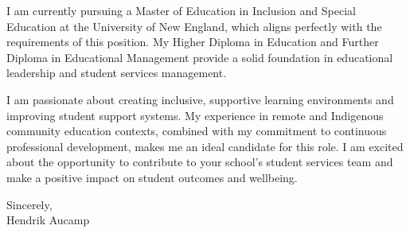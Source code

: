 \documentclass[11pt,a4paper]{article}
\begin{document}
I am currently pursuing a Master of Education in Inclusion and Special Education at the University of New England, which aligns perfectly with the requirements of this position. My Higher Diploma in Education and Further Diploma in Educational Management provide a solid foundation in educational leadership and student services management.

I am passionate about creating inclusive, supportive learning environments and improving student support systems. My experience in remote and Indigenous community education contexts, combined with my commitment to continuous professional development, makes me an ideal candidate for this role. I am excited about the opportunity to contribute to your school's student services team and make a positive impact on student outcomes and wellbeing.

\vspace{1cm}
Sincerely, \\
\vspace{0.5cm}
Hendrik Aucamp
\end{document}
